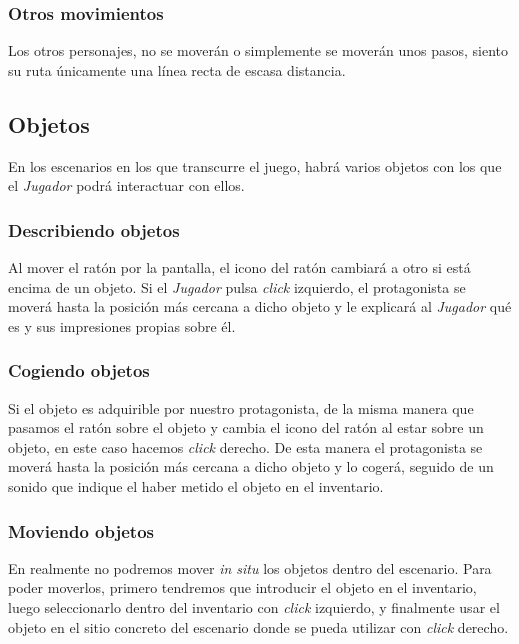             \subsubsection{Otros movimientos}
            Los otros personajes, no se moverán o simplemente se moverán unos pasos, siento su ruta únicamente una línea recta de escasa distancia.
            
        \subsection{Objetos}
        En los escenarios en los que transcurre el juego, habrá varios objetos con los que el \emph{Jugador} podrá interactuar con ellos.
            
            \subsubsection{Describiendo objetos}
            Al mover el ratón por la pantalla, el icono del ratón cambiará a otro si está encima de un objeto. Si el \emph{Jugador} pulsa \emph{click} izquierdo, el protagonista se moverá hasta la posición más cercana a dicho objeto y le explicará al \emph{Jugador} qué es y sus impresiones propias sobre él.
            
            \subsubsection{Cogiendo objetos}
            Si el objeto es adquirible por nuestro protagonista, de la misma manera que pasamos el ratón sobre el objeto y cambia el icono del ratón al estar sobre un  objeto, en este caso hacemos \emph{click} derecho. De esta manera el protagonista se moverá hasta la posición más cercana a dicho objeto y lo cogerá, seguido de un sonido que indique el haber metido el objeto en el inventario.
            
            \subsubsection{Moviendo objetos}
            En \nombrejuego realmente no podremos mover \emph{in situ} los objetos dentro del escenario. Para poder moverlos, primero tendremos que introducir el objeto en el inventario, luego seleccionarlo dentro del inventario con \emph{click} izquierdo, y finalmente usar el objeto en el sitio concreto del escenario donde se pueda utilizar con \emph{click} derecho.
            
